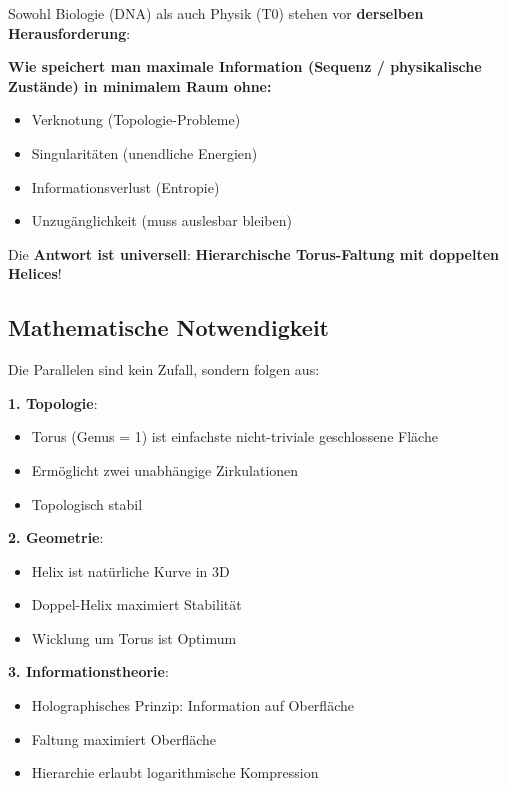	\begin{philosophical}
		Sowohl Biologie (DNA) als auch Physik (T0) stehen vor \textbf{derselben Herausforderung}:
		
		\vspace{0.3cm}
		
		\textbf{Wie speichert man maximale Information (Sequenz / physikalische Zustände) in minimalem Raum ohne:}
		\begin{itemize}
			\item Verknotung (Topologie-Probleme)
			\item Singularitäten (unendliche Energien)
			\item Informationsverlust (Entropie)
			\item Unzugänglichkeit (muss auslesbar bleiben)
		\end{itemize}
		
		\vspace{0.3cm}
		
		Die \textbf{Antwort ist universell}: \textbf{Hierarchische Torus-Faltung mit doppelten Helices}!
	\end{philosophical}
	
	\subsection{Mathematische Notwendigkeit}
	
	Die Parallelen sind kein Zufall, sondern folgen aus:
	
	\textbf{1. Topologie}:
	\begin{itemize}
		\item Torus (Genus = 1) ist einfachste nicht-triviale geschlossene Fläche
		\item Ermöglicht zwei unabhängige Zirkulationen
		\item Topologisch stabil
	\end{itemize}
	
	\textbf{2. Geometrie}:
	\begin{itemize}
		\item Helix ist natürliche Kurve in 3D
		\item Doppel-Helix maximiert Stabilität
		\item Wicklung um Torus ist Optimum
	\end{itemize}
	
	\textbf{3. Informationstheorie}:
	\begin{itemize}
		\item Holographisches Prinzip: Information auf Oberfläche
		\item Faltung maximiert Oberfläche
		\item Hierarchie erlaubt logarithmische Kompression
	\end{itemize}
	
